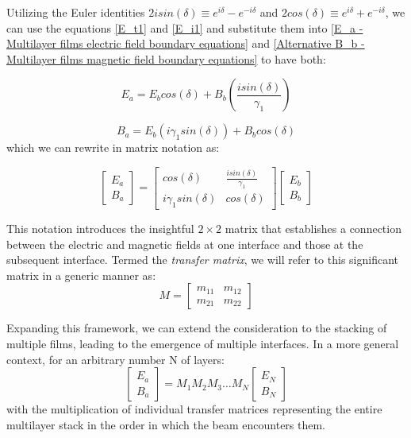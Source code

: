 Utilizing the Euler identities $2isin(\delta) \equiv e^{i\delta} - e^{-i\delta}$ and $2cos(\delta) \equiv e^{i\delta} + e^{-i\delta}$, we can use the equations \ref{E_t1} and \ref{E_i1} and substitute them into \ref{E_a - Multilayer films electric field boundary equations} and \ref{Alternative B_b - Multilayer films magnetic field boundary equations} to have both:

    \begin{equation} \label{E_a in terms of E_b and B_b}
    E_a = E_bcos(\delta) + B_b\left(\frac{isin(\delta)}{\gamma_1}\right)
    \end{equation}
    
    \begin{equation} \label{B_a in terms of E_b and B_b}
    B_a = E_b(i\gamma_1sin(\delta)) + B_bcos(\delta)
    \end{equation}
which we can rewrite in matrix notation as:

    \[
      \begin{bmatrix}\label{Full form transfer matrix}
        E_a  \\
        B_a
      \end{bmatrix} = 
            \begin{bmatrix}
            cos(\delta) & \frac{isin(\delta)}{\gamma_1}    \\
            i\gamma_1sin(\delta) & cos(\delta)
            \end{bmatrix}
            \begin{bmatrix}
            E_b  \\
            B_b
          \end{bmatrix}
    \]

This notation introduces the insightful $2 \times 2$ matrix that establishes a connection between the electric and magnetic fields at one interface and those at the subsequent interface. Termed the \emph{transfer matrix}, we will refer to this significant matrix in a generic manner as: %
    \[
    M=
      \begin{bmatrix}
        m_{11} & m_{12}  \\
        m_{21} & m_{22}
      \end{bmatrix}
    \]

Expanding this framework, we can extend the consideration to the stacking of multiple films, leading to the emergence of multiple interfaces. In a more general context, for an arbitrary number N of layers: %
    \[
      \begin{bmatrix}
        E_a  \\
        B_a
      \end{bmatrix} = 
            M_1M_2M_3\hdots M_N
            \begin{bmatrix}
            E_N \\
            B_N
          \end{bmatrix}
    \]
with the multiplication of individual transfer matrices representing the entire multilayer stack in the order in which the beam encounters them.


